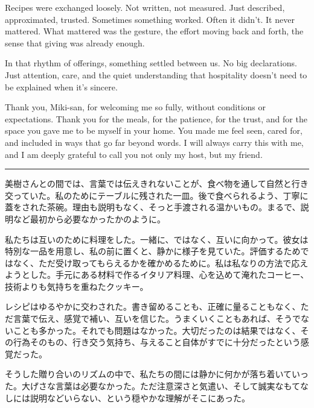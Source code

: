 \documentclass[
  letterpaper,
  oneside]{scrbook}
\begin{document}
Recipes were exchanged loosely. Not written, not measured. Just
described, approximated, trusted. Sometimes something worked. Often it
didn't. It never mattered. What mattered was the gesture, the effort
moving back and forth, the sense that giving was already enough.

In that rhythm of offerings, something settled between us. No big
declarations. Just attention, care, and the quiet understanding that
hospitality doesn't need to be explained when it's sincere.

Thank you, Miki-san, for welcoming me so fully, without conditions or
expectations. Thank you for the meals, for the patience, for the trust,
and for the space you gave me to be myself in your home. You made me
feel seen, cared for, and included in ways that go far beyond words. I
will always carry this with me, and I am deeply grateful to call you not
only my host, but my friend.

\begin{center}\rule{0.5\linewidth}{0.5pt}\end{center}

美樹さんとの間では、言葉では伝えきれないことが、食べ物を通して自然と行き交っていた。私のためにテーブルに残された一皿。後で食べられるよう、丁寧に蓋をされた茶碗。理由も説明もなく、そっと手渡される温かいもの。まるで、説明など最初から必要なかったかのように。

私たちは互いのために料理をした。一緒に、ではなく、互いに向かって。彼女は特別な一品を用意し、私の前に置くと、静かに様子を見ていた。評価するためではなく、ただ受け取ってもらえるかを確かめるために。私は私なりの方法で応えようとした。手元にある材料で作るイタリア料理、心を込めて淹れたコーヒー、技術よりも気持ちを重ねたクッキー。

レシピはゆるやかに交わされた。書き留めることも、正確に量ることもなく、ただ言葉で伝え、感覚で補い、互いを信じた。うまくいくこともあれば、そうでないことも多かった。それでも問題はなかった。大切だったのは結果ではなく、その行為そのもの、行き交う気持ち、与えること自体がすでに十分だったという感覚だった。

そうした贈り合いのリズムの中で、私たちの間には静かに何かが落ち着いていった。大げさな言葉は必要なかった。ただ注意深さと気遣い、そして誠実なもてなしには説明などいらない、という穏やかな理解がそこにあった。


\chapter{}\label{section-2}
\end{document}
